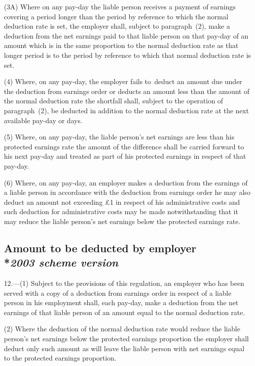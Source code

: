 \documentclass[12pt,a4paper]{article}
\begin{document}
(3A) Where on any pay-day the liable person receives a payment of earnings covering a period longer than the period by reference to which the normal deduction rate is set, the employer shall, subject to paragraph~(2), make a deduction from the net earnings paid to that liable person on that pay-day of an amount which is in the same proportion to the normal deduction rate as that longer period is to the period by reference to which that normal deduction rate is set.

(4) Where, on any pay-day, the employer fails to~deduct an amount due under the deduction from earnings order or deducts an amount less than the amount of the normal deduction rate the shortfall shall, subject to the operation of paragraph~(2), be deducted in addition to the normal deduction rate at the next available pay-day or days.

(5) Where, on any pay-day, the liable person’s net earnings are less than his protected earnings rate the amount of the difference shall be carried forward to his next pay-day and treated as part of his protected earnings in respect of that pay-day.

(6) Where, on any pay-day, an employer makes a deduction from the earnings of a liable person in accordance with the deduction from earnings order he may also deduct an amount not exceeding £1 in respect of his administrative costs and such deduction for administrative costs may be made notwithstanding that it may reduce the liable person’s net earnings below the protected earnings rate.


\subsection[12. Amount to be deducted by employer --- \emph{2003 scheme version}]{Amount to be deducted by employer\\*\emph{2003 scheme version}}

12.—(1) Subject to the provisions of this regulation, an employer who has been served with a copy of a deduction from earnings order in respect of a liable person in his employment shall, each pay-day, make a deduction from the net earnings of that liable person of an amount equal to the normal deduction rate.

(2) Where the deduction of the normal deduction rate would reduce the liable person’s net earnings below the 
protected earnings proportion  %
the employer shall deduct only such amount as will leave the liable person with net earnings equal to the 
protected earnings proportion.  %
\end{document}
